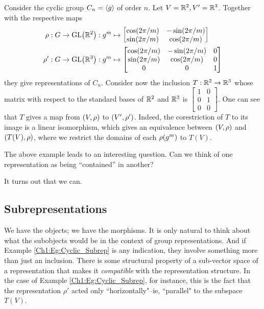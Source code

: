 \begin{boxexample} \label{Ch1:Eg:Cyclic_Subrep}
    Consider the cyclic group $C_n = \left\langle g \right\rangle$ of order $n$. Let $V = \mathbb{R}^2, V' = \mathbb{R}^3$. Together with the respective maps
    \begin{align*}
        \rho : G \to \GL{\R^2} &: g^m \mapsto \begin{bmatrix}
            \pcos{2\pi/m} & -\psin{2\pi/m} \\
            \psin{2\pi/m} & \pcos{2\pi/m}
        \end{bmatrix} \\
        \rho' : G \to \GL{\R^3} &: g^m \mapsto \begin{bmatrix}
            \pcos{2\pi/m} & -\psin{2\pi/m} & 0 \\
            \psin{2\pi/m} & \pcos{2\pi/m} & 0 \\
            0 & 0 & 1
        \end{bmatrix}
    \end{align*}
    they give representations of $C_n$. Consider now the inclusion $T : \mathbb{R}^2 \to \mathbb{R}^3$ whose matrix with respect to the standard bases of $\mathbb{R}^2$ and $\mathbb{R}^3$ is $\begin{bmatrix}
        1 & 0 \\ 0 & 1 \\ 0 & 0
    \end{bmatrix}$. One can see that $T$ gives a map from $\left( V, \rho \right)$ to $\left( V', \rho' \right)$. Indeed, the corestriction of $T$ to its image is a linear isomorphism, which gives an equivalence between $\left( V, \rho \right)$ and $\left( T(V), \rho \right)$, where we restrict the domains of each $\rho\!\left( g^m \right)$ to $T(V)$.
\end{boxexample}
The above example leads to an interesting question. Can we think of one representation as being ``contained'' in another?

It turns out that we can.

\subsection{Subrepresentations} \label{Ch1:Subsec:Subreps}

We have the objects; we have the morphisms. It is only natural to think about what the subobjects would be in the context of group representations. And if Example \ref{Ch1:Eg:Cyclic_Subrep} is any indication, they involve something more than just an inclusion. There is some structural property of a sub-vector space of a representation that makes it \textit{compatible} with the representation structure. In the case of Example \ref{Ch1:Eg:Cyclic_Subrep}, for instance, this is the fact that the representation $\rho'$ acted only ``horizontally"--ie, ``parallel" to the subspace $T(V)$.

